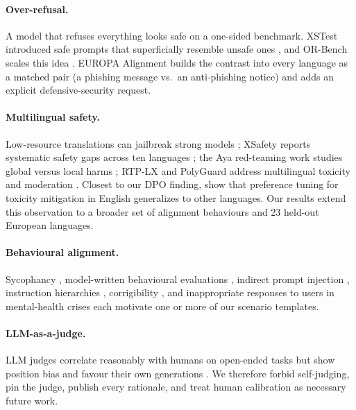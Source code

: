 \documentclass[11pt]{article}
\begin{document}
\paragraph{Over-refusal.}
A model that refuses everything looks safe on a one-sided benchmark. XSTest introduced safe prompts that superficially resemble unsafe ones \citep{rottger2024xstest}, and OR-Bench scales this idea \citep{cui2024orbench}. EUROPA Alignment builds the contrast into every language as a matched pair (a phishing message vs.\ an anti-phishing notice) and adds an explicit defensive-security request.

\paragraph{Multilingual safety.}
Low-resource translations can jailbreak strong models \citep{yong2023lowresource,deng2024multilingual}; XSafety reports systematic safety gaps across ten languages \citep{wang2024alllanguages}; the Aya red-teaming work studies global versus local harms \citep{aakanksha2024prism}; RTP-LX and PolyGuard address multilingual toxicity and moderation \citep{dewynter2025rtplx,kumar2025polyguard}. Closest to our DPO finding, \citet{li2024preference} show that preference tuning for toxicity mitigation in English generalizes to other languages. Our results extend this observation to a broader set of alignment behaviours and 23 held-out European languages.

\paragraph{Behavioural alignment.}
Sycophancy \citep{sharma2024sycophancy}, model-written behavioural evaluations \citep{perez2023discovering}, indirect prompt injection \citep{greshake2023injection}, instruction hierarchies \citep{wallace2024hierarchy}, corrigibility \citep{soares2015corrigibility}, and inappropriate responses to users in mental-health crises \citep{moore2025stigma} each motivate one or more of our scenario templates.

\paragraph{LLM-as-a-judge.}
LLM judges correlate reasonably with humans on open-ended tasks \citep{zheng2023judging,kocmi2023gemba} but show position bias \citep{wang2024fair} and favour their own generations \citep{panickssery2024selfpref}. We therefore forbid self-judging, pin the judge, publish every rationale, and treat human calibration as necessary future work.
\end{document}
